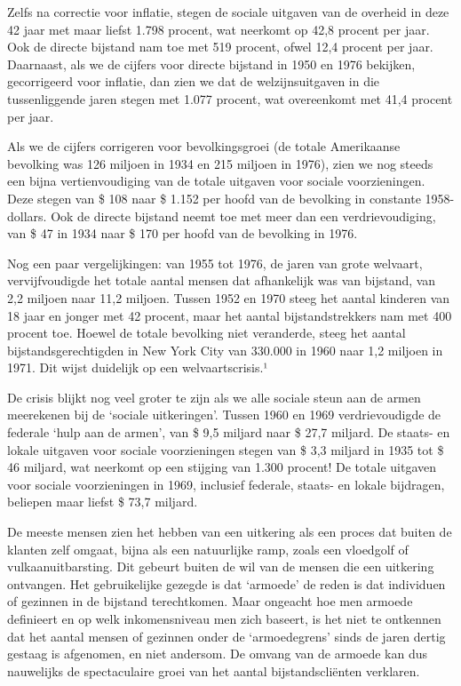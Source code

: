 \documentclass[
  a5paper,
  smalldemyvopaper,10pt,twoside,onecolumn,openright,extrafontsizes,hidelinks]{memoir}
\begin{document}
Zelfs na correctie voor inflatie, stegen de sociale uitgaven van de
overheid in deze 42 jaar met maar liefst 1.798 procent, wat neerkomt op
42,8 procent per jaar. Ook de directe bijstand nam toe met 519 procent,
ofwel 12,4 procent per jaar. Daarnaast, als we de cijfers voor directe
bijstand in 1950 en 1976 bekijken, gecorrigeerd voor inflatie, dan zien
we dat de welzijnsuitgaven in die tussenliggende jaren stegen met 1.077
procent, wat overeenkomt met 41,4 procent per jaar.

Als we de cijfers corrigeren voor bevolkingsgroei (de totale Amerikaanse
bevolking was 126 miljoen in 1934 en 215 miljoen in 1976), zien we nog
steeds een bijna vertienvoudiging van de totale uitgaven voor sociale
voorzieningen. Deze stegen van \$ 108 naar \$ 1.152 per hoofd van de
bevolking in constante 1958-dollars. Ook de directe bijstand neemt toe
met meer dan een verdrievoudiging, van \$ 47 in 1934 naar \$ 170 per
hoofd van de bevolking in 1976.

Nog een paar vergelijkingen: van 1955 tot 1976, de jaren van grote
welvaart, vervijfvoudigde het totale aantal mensen dat afhankelijk was
van bijstand, van 2,2 miljoen naar 11,2 miljoen. Tussen 1952 en 1970
steeg het aantal kinderen van 18 jaar en jonger met 42 procent, maar het
aantal bijstandstrekkers nam met 400 procent toe. Hoewel de totale
bevolking niet veranderde, steeg het aantal bijstandsgerechtigden in New
York City van 330.000 in 1960 naar 1,2 miljoen in 1971. Dit wijst
duidelijk op een welvaartscrisis.¹

De crisis blijkt nog veel groter te zijn als we alle sociale steun aan
de armen meerekenen bij de `sociale uitkeringen'. Tussen 1960 en 1969
verdrievoudigde de federale `hulp aan de armen', van \$ 9,5 miljard naar
\$ 27,7 miljard. De staats- en lokale uitgaven voor sociale
voorzieningen stegen van \$ 3,3 miljard in 1935 tot \$ 46 miljard, wat
neerkomt op een stijging van 1.300 procent! De totale uitgaven voor
sociale voorzieningen in 1969, inclusief federale, staats- en lokale
bijdragen, beliepen maar liefst \$ 73,7 miljard.

De meeste mensen zien het hebben van een uitkering als een proces dat
buiten de klanten zelf omgaat, bijna als een natuurlijke ramp, zoals een
vloedgolf of vulkaanuitbarsting. Dit gebeurt buiten de wil van de mensen
die een uitkering ontvangen. Het gebruikelijke gezegde is dat `armoede'
de reden is dat individuen of gezinnen in de bijstand terechtkomen. Maar
ongeacht hoe men armoede definieert en op welk inkomensniveau men zich
baseert, is het niet te ontkennen dat het aantal mensen of gezinnen
onder de `armoedegrens' sinds de jaren dertig gestaag is afgenomen, en
niet andersom. De omvang van de armoede kan dus nauwelijks de
spectaculaire groei van het aantal bijstandscliënten verklaren.
\end{document}
